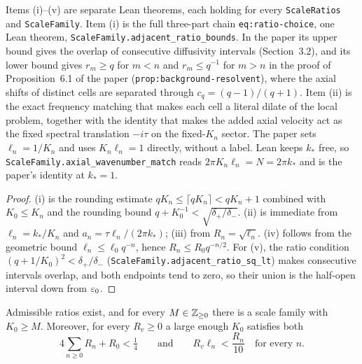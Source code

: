 Items (i)--(v) are separate Lean theorems, each holding for every
\texttt{ScaleRatios} and \texttt{ScaleFamily}.  Item (i) is the full three-part chain
\texttt{eq:ratio-choice}, one Lean theorem,
\texttt{ScaleFamily.adjacent\_ratio\_bounds}.  In the paper its upper bound gives the
overlap of consecutive diffusivity intervals (Section~3.2), and its lower bound gives $r_m\geq q $
for $m<n $ and $r_m\leq q^{-1} $ for $m>n $ in the proof of Proposition~6.1 of the paper
(\texttt{prop:background-resolvent}), where the axial shifts of distinct cells are separated
through $c_q=(q-1)/(q+1) $.  Item (ii) is the exact frequency matching
that makes each cell a literal dilate of the local problem, together with the identity that
makes the added axial velocity act as the fixed spectral translation $-i\tau $ on the
fixed-$K_n $ sector.  The paper sets $\ell_n=1/K_n $ and uses $K_n\ell_n=1 $ directly,
without a label.  Lean keeps $k_* $ free, so \texttt{ScaleFamily.axial\_wavenumber\_match}
reads $2\pi K_n\ell_n=N=2\pi k_* $ and is the paper's identity at $k_*=1 $.

\begin{proof}
  \leanok
  (i) is the rounding estimate $qK_n\leq\lceil qK_n\rceil<qK_n+1 $ combined with
  $K_0\leq K_n $ and the rounding bound $q+K_0^{-1}<\sqrt{\delta_+/\delta_-} $.  (ii) is
  immediate from $\ell_n=k_*/K_n $ and
  $a_n=\tau\ell_n/(2\pi k_*) $; (iii) from $R_n=\sqrt{\ell_n} $.  (iv) follows from the
  geometric bound $\ell_n\leq\ell_0q^{-n} $, hence $R_n\leq R_0q^{-n/2} $.  For (v), the
  ratio condition $(q+1/K_0)^2<\delta_+/\delta_- $
  (\texttt{ScaleFamily.adjacent\_ratio\_sq\_lt}) makes consecutive intervals overlap, and
  both endpoints tend to zero, so their union is the half-open interval down from $\varepsilon_0 $.
\end{proof}

\begin{lemma}
  \label{lem:velocity:base-index}
  \leanok
  Admissible ratios exist, and for every $M\in\mathbb{Z}_{\geq0} $ there is a scale family with
  $K_0\geq M $.  Moreover, for every $R_v\geq0 $ a large enough $K_0 $ satisfies both
  \[
    4\sum_{n\geq0}R_n+R_0<\tfrac14
    \qquad\text{and}\qquad
    R_v\ell_n<\frac{R_n}{10}\quad\text{for every }n .
  \]
\end{lemma}

